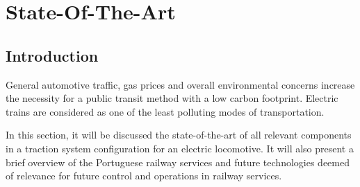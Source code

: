 \chapter{State-Of-The-Art} \label{chap:sota}

\section{Introduction}\label{sec:sota_intro}


General automotive traffic, gas prices and overall environmental concerns increase the necessity for a public transit method with a low carbon footprint. Electric trains are considered as one of the least polluting modes of transportation.

In this section, it will be discussed the state-of-the-art of all relevant components in a traction system configuration for an electric locomotive. It will also present a brief overview of the Portuguese railway services and future technologies deemed of relevance for future control and operations in railway services.

